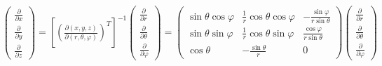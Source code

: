 \documentclass[../../FisicaTeorica.tex]{subfiles}
\begin{document}
\begin{align}
\begin{pmatrix}
\frac{\partial}{\partial x}\\
\frac{\partial}{\partial y}\\
\frac{\partial}{\partial z}
\end{pmatrix} = \left[\left(\frac{\partial (x,y,z)}{\partial (r,\theta,\varphi)}\right)^T\right]^{-1} \begin{pmatrix}
\frac{\partial}{\partial r}\\
\frac{\partial}{\partial \theta}\\
\frac{\partial}{\partial \varphi}
\end{pmatrix}= 
\begin{pmatrix}
\sin\theta \cos\varphi & \frac{1}{r}\cos\theta\cos\varphi &- \frac{\sin\varphi}{r\sin\theta}\\
\sin\theta\sin\varphi & \frac{1}{r}\cos\theta\sin\varphi & \frac{\cos\varphi}{r\sin\theta}\\
\cos\theta & -\frac{\sin\theta}{r} & 0
\end{pmatrix}
\begin{pmatrix}
\frac{\partial}{\partial r}\\
\frac{\partial}{\partial \theta}\\
\frac{\partial}{\partial \varphi}
\end{pmatrix}
\label{eqn:relazione_inversa}
\end{align}
\end{document}

